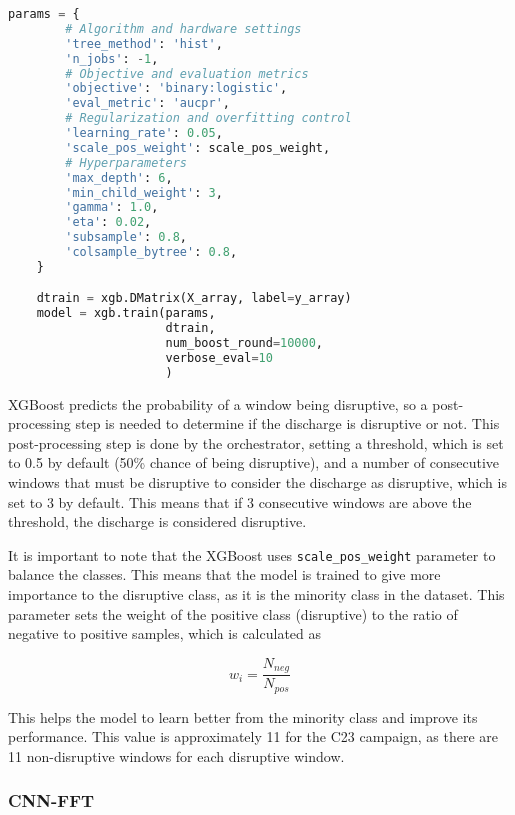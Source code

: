 \begin{lstlisting}[language=Python, caption={XGBoost model parameters}, label={lst:xgboost-params}]
    params = {
        # Algorithm and hardware settings
        'tree_method': 'hist',
        'n_jobs': -1,
        # Objective and evaluation metrics
        'objective': 'binary:logistic',
        'eval_metric': 'aucpr',
        # Regularization and overfitting control
        'learning_rate': 0.05,
        'scale_pos_weight': scale_pos_weight,
        # Hyperparameters
        'max_depth': 6,
        'min_child_weight': 3,
        'gamma': 1.0,
        'eta': 0.02,
        'subsample': 0.8,
        'colsample_bytree': 0.8,
    }

    dtrain = xgb.DMatrix(X_array, label=y_array)
    model = xgb.train(params, 
                      dtrain, 
                      num_boost_round=10000, 
                      verbose_eval=10
                      )

\end{lstlisting}

XGBoost predicts the probability of a window being disruptive, so a post-processing step is needed to determine if the discharge is disruptive or not. This post-processing step is done by the orchestrator, setting a threshold, which is set to 0.5 by default (50\% chance of being disruptive), and a number of consecutive windows that must be disruptive to consider the discharge as disruptive, which is set to 3 by default. This means that if 3 consecutive windows are above the threshold, the discharge is considered disruptive.

It is important to note that the XGBoost uses \texttt{scale\_pos\_weight} parameter to balance the classes. This means that the model is trained to give more importance to the disruptive class, as it is the minority class in the dataset. This parameter sets the weight of the positive class (disruptive) to the ratio of negative to positive samples, which is calculated as 

\begin{equation}
    w_i = \frac{N_{neg}}{N_{pos}}
    \label{eq:scale_pos_weight}
\end{equation}

This helps the model to learn better from the minority class and improve its performance. This value is approximately 11 for the C23 campaign, as there are 11 non-disruptive windows for each disruptive window.

\subsubsection{CNN-FFT}

